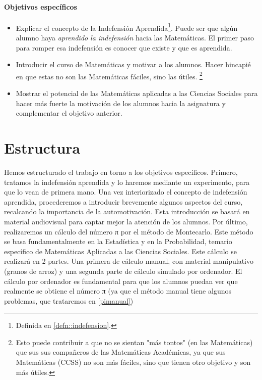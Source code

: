 \paragraph{Objetivos específicos}
\begin{itemize}
	\item Explicar el concepto de la Indefensión Aprendida\footnote{Definida en \ref{defn::indefension}.}. Puede ser que algún alumno haya \textit{aprendido la indefensión} hacia las Matemáticas. El primer paso para romper esa indefensión es conocer que existe y que es aprendida.
	\item Introducir el curso de Matemáticas y motivar a los alumnos.
	\subitem Hacer hincapié en que estas no son las Matemáticas fáciles, sino las útiles. \footnote{Esto puede contribuir a que no se sientan "más tontos" (en las Matemáticas) que sus sus compañeros de las Matemáticas Académicas, ya que sus Matemáticas (CCSS) no son más fáciles, sino que tienen otro objetivo y son más útiles.}
	\item Mostrar el potencial de las Matemáticas aplicadas a las Ciencias Sociales para hacer más fuerte la motivación de los alumnos hacia la asignatura y complementar el objetivo anterior.
\end{itemize}

\section{Estructura}

Hemos estructurado el trabajo en torno a los objetivos específicos. 
%
Primero, tratamos la indefensión aprendida y lo haremos mediante un experimento, para que lo vean de primera mano.
%
Una vez interiorizado el concepto de indefensión aprendida, procederemos a introducir brevemente algunos aspectos del curso, recalcando la importancia de la automotivación.
%
Esta introducción se basará en material audiovisual para captar mejor la atención de los alumnos.
%
Por último, realizaremos un cálculo del número π por el método de Montecarlo. 
%
Este método se basa fundamentalmente en la Estadística y en la Probabilidad, temario específico de Matemáticas Aplicadas a las Ciencias Sociales.
%
Este cálculo se realizará en 2 partes. Una primera de cálculo manual, con material manipulativo (granos de arroz) y una segunda parte de cálculo simulado por ordenador.
%
El cálculo por ordenador es fundamental para que los alumnos puedan ver que realmente se obtiene el número π (ya que el método manual tiene algunos problemas, que trataremos en \ref{pimanual})

